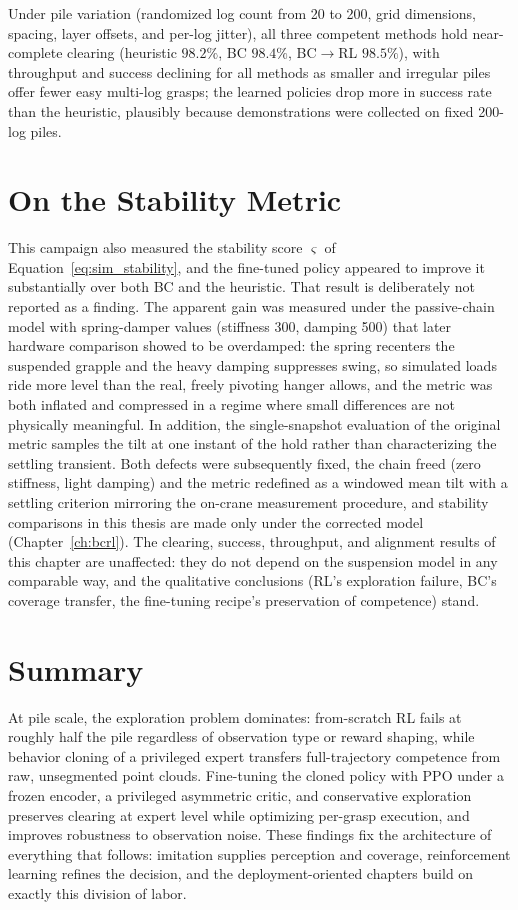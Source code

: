 Under pile variation (randomized log count from 20 to 200, grid dimensions,
spacing, layer offsets, and per-log jitter), all three competent methods hold
near-complete clearing (heuristic $98.2\%$, BC $98.4\%$, BC$\to$RL $98.5\%$),
with throughput and success declining for all methods as smaller and
irregular piles offer fewer easy multi-log grasps; the learned policies drop
more in success rate than the heuristic, plausibly because demonstrations
were collected on fixed 200-log piles.

\section{On the Stability Metric}
\label{sec:sim_study_stability}

This campaign also measured the stability score $\varsigma$ of
Equation~\eqref{eq:sim_stability}, and the fine-tuned policy appeared to
improve it substantially over both BC and the heuristic. That result is
deliberately not reported as a finding. The apparent gain was measured under
the passive-chain model with spring-damper values (stiffness 300, damping
500) that later hardware comparison showed to be overdamped: the spring
recenters the suspended grapple and the heavy damping suppresses swing, so
simulated loads ride more level than the real, freely pivoting hanger allows,
and the metric was both inflated and compressed in a regime where small
differences are not physically meaningful. In addition, the single-snapshot
evaluation of the original metric samples the tilt at one instant of the
hold rather than characterizing the settling transient. Both defects were
subsequently fixed, the chain freed (zero stiffness, light damping) and the
metric redefined as a windowed mean tilt with a settling criterion mirroring
the on-crane measurement procedure, and stability comparisons in this thesis
are made only under the corrected model (Chapter~\ref{ch:bcrl}). The
clearing, success, throughput, and alignment results of this chapter are
unaffected: they do not depend on the suspension model in any comparable way,
and the qualitative conclusions (RL's exploration failure, BC's coverage
transfer, the fine-tuning recipe's preservation of competence) stand.

\section{Summary}

At pile scale, the exploration problem dominates: from-scratch RL fails at
roughly half the pile regardless of observation type or reward shaping, while
behavior cloning of a privileged expert transfers full-trajectory competence
from raw, unsegmented point clouds. Fine-tuning the cloned policy with PPO
under a frozen encoder, a privileged asymmetric critic, and conservative
exploration preserves clearing at expert level while optimizing per-grasp
execution, and improves robustness to observation noise. These findings fix
the architecture of everything that follows: imitation supplies perception
and coverage, reinforcement learning refines the decision, and the
deployment-oriented chapters build on exactly this division of labor.
